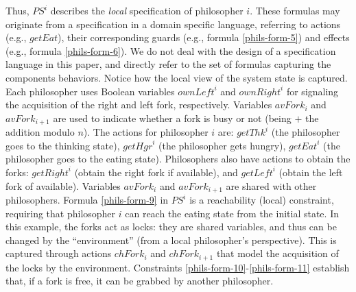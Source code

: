 Thus, $\mathit{PS}^i$ describes the \emph{local} specification of philosopher $i$. These formulas may originate from a specification in a domain specific language, referring to actions (e.g., $\mathit{getEat}$), their corresponding guards (e.g., formula \ref{phils-form-5}) and effects (e.g., formula \ref{phils-form-6}). We do not deal with the design of a specification language in this paper, and directly refer to the set of formulas capturing the components behaviors. Notice how the local view of the system state is captured. Each philosopher uses Boolean variables $\mathit{ownLeft}^i$ and $\mathit{ownRight}^i$ for signaling the acquisition of the right and left fork, respectively. Variables $\mathit{avFork}_{i}$ and $\mathit{avFork}_{i+1}$ are used to indicate whether a fork is busy or not (being $+$ the addition modulo $n$).  The actions for philosopher $i$ are: $\mathit{getThk}^i$ (the philosopher goes to the thinking state), $\mathit{getHgr}^i$ (the philosopher gets hungry), $\mathit{getEat}^i$ (the philosopher goes to the eating state). Philosophers also have actions to obtain the forks: $\mathit{getRight}^i$ (obtain the right fork if available), and $\mathit{getLeft}^{i}$ (obtain the left fork of available). %
Variables $\mathit{avFork}_{i}$ and $\mathit{avFork}_{i+1}$ are shared with other philosophers. 
%
Formula \ref{phils-form-9} in $\mathit{PS}^i$ is a reachability (local) constraint, requiring that philosopher $i$ can  reach the eating state from the initial state. In this example, the forks act as locks: they are shared variables, and thus can be changed by the ``environment'' (from a local philosopher's perspective). This is captured through actions $\mathit{chFork}_{i}$ and $\mathit{chFork}_{i+1}$ that model the acquisition of the locks by the environment. Constraints \ref{phils-form-10}-\ref{phils-form-11} establish that, if a fork is free, it can be grabbed by another philosopher. 

